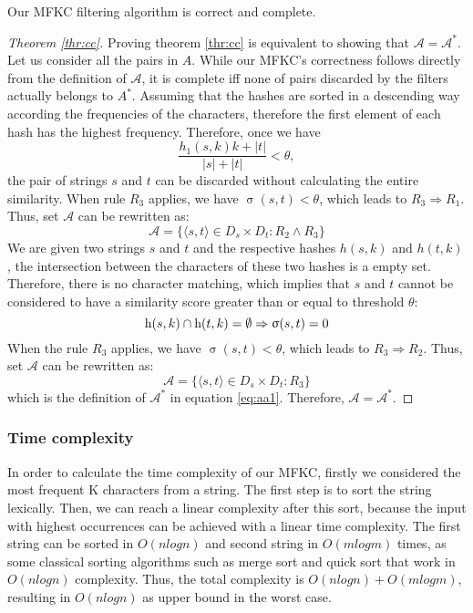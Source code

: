 \begin{theorem} \label{thr:cc}
Our MFKC filtering algorithm is correct and complete.
\end{theorem}

\begin{proof}[Theorem \ref{thr:cc}]
	Proving theorem \ref{thr:cc} is equivalent to showing that $\mathcal{A}=\mathcal{A}^*$. Let us consider all the pairs in $A$. While our MFKC's correctness follows directly from the definition of $\mathcal{A}$, it is complete iff none of pairs discarded by the filters actually belongs to $A^*$. Assuming that the hashes are sorted in a descending way according the frequencies of the characters, therefore the first element of each hash has the highest frequency. Therefore, once we have 
	\begin{equation*}
		\frac{h_1(s,k) k + |t|}{|s| + |t|} < \theta,
	\end{equation*}
	the pair of strings $s$ and $t$ can be discarded without calculating the entire similarity. When rule $R_3$ applies, we have $\upsigma(s,t) < \theta$, which leads to $R_3 \Rightarrow R_1$. Thus, set $\mathcal{A}$ can be rewritten as:
	\begin{equation}
		\mathcal{A}=\{\langle s,t \rangle \in D_s \times D_t : R_2 \wedge R_3 \} 
	\end{equation}	
	We are given two strings $s$ and $t$ and the respective hashes $h(s,k)$ and $h(t,k)$, the intersection between the characters of these two hashes is a empty set. Therefore, there is no character matching, which implies that $s$ and $t$ cannot be considered to have a similarity score greater than or equal to threshold $\theta$:
	\begin{equation*}
		\textnormal{h}(s,k) \cap \textnormal{h}(t,k) = \emptyset \Rightarrow \upsigma(s,t)=0
	\end{equation*}
	When the rule $R_3$ applies, we have $\upsigma(s,t) < \theta$, which leads to $R_3 \Rightarrow R_2$. Thus, set $\mathcal{A}$ can be rewritten as:
	\begin{equation}
		\mathcal{A}=\{\langle s,t \rangle \in D_s \times D_t : R_3 \} 
	\end{equation}
    which is the definition of $\mathcal{A}^*$ in equation \ref{eq:aa1}. Therefore, $\mathcal{A}=\mathcal{A}^*$.
\end{proof}
%
\subsubsection{Time complexity}
In order to calculate the time complexity of our MFKC, firstly we considered the most frequent K characters from a string.
The first step is to sort the string lexically. 
Then, we can reach a linear complexity after this sort, because the input with highest occurrences can be achieved with a linear time complexity. 
The first string can be sorted in $O (n log n)$ and second string in $O(m log m)$ times, as some classical sorting algorithms such as merge sort \cite{goldstine1948planning} and quick sort \cite{hoare1962quicksort} that work in $O(n log n)$ complexity. 
Thus, the total complexity is $O(n log n) + O(m log m)$, resulting in $O(n log n)$ as upper bound in the worst case.


